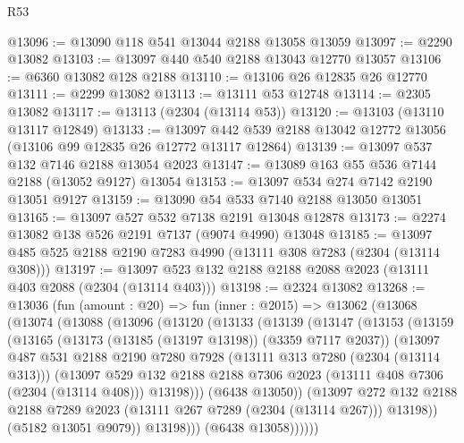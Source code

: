 \begin{lexlean}{R53}
\begin{coremodule}
@13096 := @13090 @118 @541 @13044 @2188 @13058 @13059
@13097 := @2290 @13082
@13103 := @13097 @440 @540 @2188 @13043 @12770 @13057
@13106 := @6360 @13082 @128 @2188
@13110 := @13106 @26 @12835 @26 @12770
@13111 := @2299 @13082
@13113 := @13111 @53 @12748
@13114 := @2305 @13082
@13117 := @13113 (@2304 (@13114 @53))
@13120 := @13103 (@13110 @13117 @12849)
@13133 := @13097 @442 @539 @2188 @13042 @12772 @13056 (@13106 @99 @12835 @26 @12772 @13117 @12864)
@13139 := @13097 @537 @132 @7146 @2188 @13054 @2023
@13147 := @13089 @163 @55 @536 @7144 @2188 (@13052 @9127) @13054
@13153 := @13097 @534 @274 @7142 @2190 @13051 @9127
@13159 := @13090 @54 @533 @7140 @2188 @13050 @13051
@13165 := @13097 @527 @532 @7138 @2191 @13048 @12878
@13173 := @2274 @13082 @138 @526 @2191 @7137 (@9074 @4990) @13048
@13185 := @13097 @485 @525 @2188 @2190 @7283 @4990 (@13111 @308 @7283 (@2304 (@13114 @308)))
@13197 := @13097 @523 @132 @2188 @2188 @2088 @2023 (@13111 @403 @2088 (@2304 (@13114 @403)))
@13198 := @2324 @13082
@13268 := @13036
    (fun (amount : @20) =>
    fun (inner : @2015) =>
    @13062
      (@13068
        (@13074
          (@13088
            (@13096
              (@13120
                (@13133
                  (@13139
                    (@13147
                      (@13153
                        (@13159
                          (@13165
                            (@13173 (@13185 (@13197 @13198)) (@3359 @7117 @2037))
                            (@13097
                              @487
                              @531
                              @2188
                              @2190
                              @7280
                              @7928
                              (@13111 @313 @7280 (@2304 (@13114 @313)))
                              (@13097
                                @529
                                @132
                                @2188
                                @2188
                                @7306
                                @2023
                                (@13111 @408 @7306 (@2304 (@13114 @408)))
                                @13198)))
                          (@6438 @13050))
                        (@13097
                          @272
                          @132
                          @2188
                          @2188
                          @7289
                          @2023
                          (@13111 @267 @7289 (@2304 (@13114 @267)))
                          @13198))
                      (@5182 @13051 @9079))
                    @13198)))
              (@6438 @13058))))))

\end{coremodule}
\end{lexlean}
